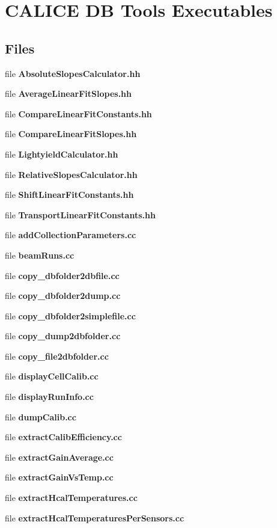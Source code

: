 \section{C\-A\-L\-I\-C\-E D\-B Tools Executables}
\label{group__tools}
\subsection*{Files}
\begin{DoxyCompactItemize}
\item 
file {\bf Absolute\-Slopes\-Calculator.\-hh}
\item 
file {\bf Average\-Linear\-Fit\-Slopes.\-hh}
\item 
file {\bf Compare\-Linear\-Fit\-Constants.\-hh}
\item 
file {\bf Compare\-Linear\-Fit\-Slopes.\-hh}
\item 
file {\bf Lightyield\-Calculator.\-hh}
\item 
file {\bf Relative\-Slopes\-Calculator.\-hh}
\item 
file {\bf Shift\-Linear\-Fit\-Constants.\-hh}
\item 
file {\bf Transport\-Linear\-Fit\-Constants.\-hh}
\item 
file {\bf add\-Collection\-Parameters.\-cc}
\item 
file {\bf beam\-Runs.\-cc}
\item 
file {\bf copy\-\_\-dbfolder2dbfile.\-cc}
\item 
file {\bf copy\-\_\-dbfolder2dump.\-cc}
\item 
file {\bf copy\-\_\-dbfolder2simplefile.\-cc}
\item 
file {\bf copy\-\_\-dump2dbfolder.\-cc}
\item 
file {\bf copy\-\_\-file2dbfolder.\-cc}
\item 
file {\bf display\-Cell\-Calib.\-cc}
\item 
file {\bf display\-Run\-Info.\-cc}
\item 
file {\bf dump\-Calib.\-cc}
\item 
file {\bf extract\-Calib\-Efficiency.\-cc}
\item 
file {\bf extract\-Gain\-Average.\-cc}
\item 
file {\bf extract\-Gain\-Vs\-Temp.\-cc}
\item 
file {\bf extract\-Hcal\-Temperatures.\-cc}
\item 
file {\bf extract\-Hcal\-Temperatures\-Per\-Sensors.\-cc}

\end{DoxyCompactItemize}
